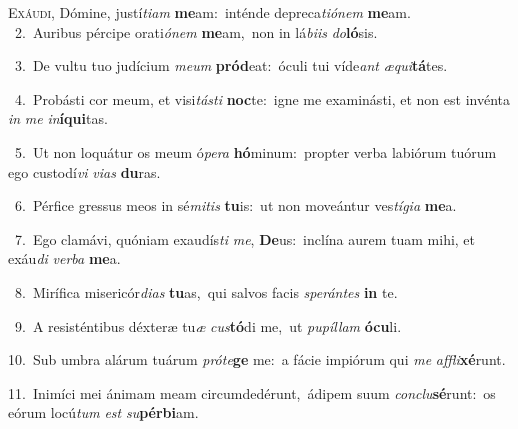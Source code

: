 \lettrine{\initial\textcolor{\initialcolor}{E}}{xáudi,} Dómine, justí\-\textit{ti}\-\textit{am} \textbf{me}\-am:~\star inténde depreca\-\textit{ti}\-\textit{ó}\textit{nem} \textbf{me}\-am.\\
{\numbfont\textcolor{\numbcolor}{~2.}}~Auribus pércipe orati\-\textit{ó}\-\textit{nem} \textbf{me}\-am,~\star non in lá\-\textit{bi}\-\textit{is} \textit{do}\-\textbf{ló}sis.\par
{\numbfont\textcolor{\numbcolor}{~3.}}~De vultu tuo judícium \textit{me}\-\textit{um} \textbf{pród}\-eat:~\star óculi tui víde\textit{ant} \textit{æ}\-\textit{qui}\textbf{tá}tes.\par
{\numbfont\textcolor{\numbcolor}{~4.}}~Probásti cor meum, et visi\-\textit{tás}\-\textit{ti} \textbf{noc}\-te:~\star igne me examinásti, et non est invénta \textit{in} \textit{me} \textit{in}\-\textbf{í}\textbf{qui}tas.\par
{\numbfont\textcolor{\numbcolor}{~5.}}~Ut non loquátur os meum ó\-\textit{pe}\-\textit{ra} \textbf{hó}\-minum:~\star propter verba labiórum tuórum ego custodí\textit{vi} \textit{vi}\-\textit{as} \textbf{du}\-ras.\par
{\numbfont\textcolor{\numbcolor}{~6.}}~Pérfice gressus meos in sé\-\textit{mi}\-\textit{tis} \textbf{tu}\-is:~\star ut non moveántur ves\-\textit{tí}\-\textit{gi}\textit{a} \textbf{me}\-a.\par
{\numbfont\textcolor{\numbcolor}{~7.}}~Ego clamávi, quóniam exaudís\textit{ti} \textit{me}\-, \textbf{De}\-us:~\star inclína aurem tuam mihi, et exáu\textit{di} \textit{ver}\-\textit{ba} \textbf{me}\-a.\par
{\numbfont\textcolor{\numbcolor}{~8.}}~Mirífica misericór\-\textit{di}\-\textit{as} \textbf{tu}\-as,~\star qui salvos facis \textit{spe}\-\textit{rán}\textit{tes} \textbf{in} te.\par
{\numbfont\textcolor{\numbcolor}{~9.}}~A resisténtibus déxteræ tu\textit{æ} \textit{cus}\-\textbf{tó}di me,~\star ut \textit{pu}\-\textit{píl}\textit{lam} \textbf{ó}\-\textbf{cu}li.\par
{\numbfont\textcolor{\numbcolor}{10.}}~Sub umbra alárum tuárum \textit{pró}\-\textit{te}\textbf{ge} me:~\star a fácie impiórum qui \textit{me} \textit{af}\-\textit{fli}\textbf{xé}runt.\par
{\numbfont\textcolor{\numbcolor}{11.}}~Inimíci mei ánimam meam circumdedérunt,~\dagger ádipem suum \textit{con}\-\textit{clu}\textbf{sé}runt:~\star os eórum locú\textit{tum} \textit{est} \textit{su}\-\textbf{pér}\textbf{bi}am.\par
